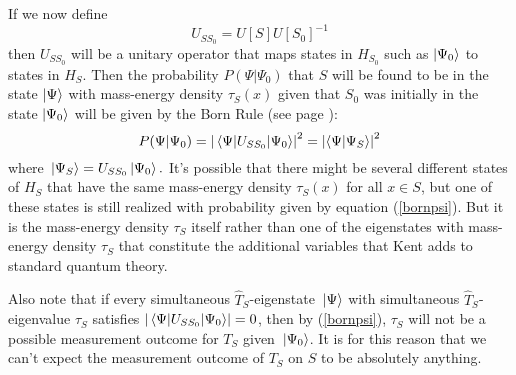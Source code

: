  If we now define 
 \begin{equation}\label{SchwingerUnitaryOP}
 U_{SS_0}=U[S]U[S_0]^{-1}
 \end{equation} 
 then $U_{SS_0}$ will be a unitary operator that maps states in $H_{S_0}$ such as $\ket{\Psi_0}$ to states in $H_S$. Then the probability $P(\Psi|\Psi_0)$ that  $S$ will be found to be in the state $\ket{\Psi}$ with mass-energy density $\tau_S(x)$ given that $S_0$ was initially in the state $\ket{\Psi_0}$ will be given by the Born Rule (see page \pageref{bornrule}):
 \begin{equation}\label{bornpsi}
 P(\Psi|\Psi_0) = \abs{\mel{\Psi}{U_{SS_0}}{\Psi_0}}^2=\abs{\ip{\Psi}{\Psi_S}}^2
 \end{equation}
 where $\ket*{\Psi_S}=U_{SS_0}\ket*{\Psi_0}.$
It's possible that there might be several different states of $H_S$ that have the same mass-energy density $\tau_S(x)$ for all $x\in S$, but one of these states is still realized with probability given by equation (\ref{bornpsi}). But it is the mass-energy density $\tau_S$ itself rather than one of the eigenstates with mass-energy density $\tau_S$ that constitute the additional variables that Kent adds to standard quantum theory. 

Also note that  if every simultaneous $\hat{T}_S$-eigenstate $\ket*{\Psi}$ with simultaneous $\hat{T}_S$-eigenvalue $\tau_S$ satisfies $\abs{\mel{\Psi}{U_{SS_0}}{\Psi_0}}=0$, then by (\ref{bornpsi}), $\tau_S$ will not be a possible measurement outcome for $T_S$ given $\ket*{\Psi_0}$. It is for this reason that we can't expect the measurement outcome of $T_S$ on $S$ to be absolutely anything.
